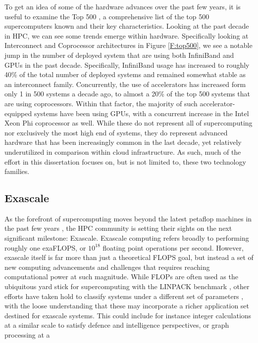 To get an idea of some of the hardware advances over the past few years, it is useful to examine the Top 500 \cite{www-top500}, a comprehensive list of the top 500 supercomputers known and their key characteristics.  Looking at the past decade in HPC, we can see some trends emerge within hardware. Specifically looking at Interconnect and Coprocessor architectures in Figure \ref{F:top500}, we see a notable jump in the number of deployed system that are using both InfiniBand and GPUs in the past decade. Specifically, InfiniBand usage has increased to roughly 40\% of the total number of deployed systems and remained somewhat stable as an interconnect family. Concurrently, the use of accelerators has increased form only 1 in 500 systems a decade ago, to almost a 20\% of the top 500 systems that are using coprocessors. Within that factor, the majority of such accelerator-equipped systems have been using GPUs, with a concurrent increase in the Intel Xeon Phi coprocessor as well.  While these do not represent all of supercomputing nor exclusively the most high end of systems, they do represent advanced hardware that has been increasingly common in the last decade, yet relatively underutilized in comparison within cloud infrastructure. As such, much of the effort in this dissertation focuses on, but is not limited to,  these two technology families.    




\subsection{Exascale}

As the forefront of supercomputing moves beyond the latest petaflop machines in the past few years \cite{bland2012titan}, the HPC community is setting their sights on the next significant milestone: Exascale. Exascale computing refers broadly to performing roughly one exaFLOPS, or $10^{18}$ floating point operations per second. However, exascale itself is far more than just a theoretical FLOPS goal, but instead a set of new computing advancements and challenges that requires reaching computational power at such magnitude.  While FLOPs are often used as the ubiquitous yard stick for supercomputing with the LINPACK benchmark \cite{dongarra2003linpack,}, other efforts have taken hold to classify systems under a different set of parameters \cite{murphy2010graph500, dongarra2013hpcg}, with the loose understanding that these may incorporate a richer application set destined for exascale systems.  This could include for instance integer calculations at a similar scale to satisfy defence and intelligence perspectives, or graph processing at a 

